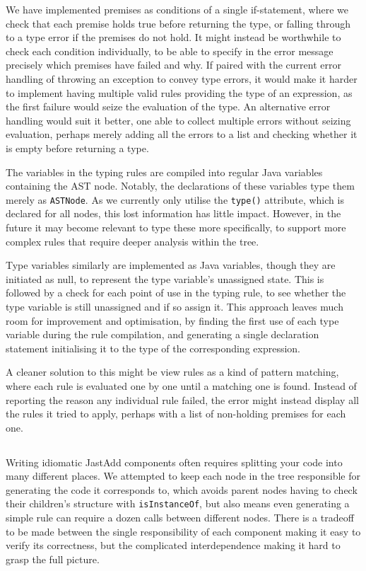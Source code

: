 \documentclass[nofilelist]{cslthse-msc}
\begin{document}
We have implemented premises as conditions of a single if-statement, where we check that each premise holds true before returning the type, or falling through to a type error if the premises do not hold.
It might instead be worthwhile to check each condition individually, to be able to specify in the error message precisely which premises have failed and why.
If paired with the current error handling of throwing an exception to convey type errors, it would make it harder to implement having multiple valid rules providing the type of an expression, as the first failure would seize the evaluation of the type.
An alternative error handling would suit it better, one able to collect multiple errors without seizing evaluation, perhaps merely adding all the errors to a list and checking whether it is empty before returning a type.

The variables in the typing rules are compiled into regular Java variables containing the AST node.
Notably, the declarations of these variables type them merely as \verb|ASTNode|.
As we currently only utilise the \lstinline{type()} attribute, which is declared for all nodes, this lost information has little impact.
However, in the future it may become relevant to type these more specifically, to support more complex rules that require deeper analysis within the tree.

Type variables similarly are implemented as Java variables, though they are initiated as null, to represent the type variable's unassigned state.
This is followed by a check for each point of use in the typing rule, to see whether the type variable is still unassigned and if so assign it.
This approach leaves much room for improvement and optimisation, by finding the first use of each type variable during the rule compilation, and generating a single declaration statement initialising it to the type of the corresponding expression.

A cleaner solution to this might be view rules as a kind of pattern matching, where each rule is evaluated one by one until a matching one is found.
Instead of reporting the reason any individual rule failed, the error might instead display all the rules it tried to apply, perhaps with a list of non-holding premises for each one.

\subsection{\rqthree}
Writing idiomatic JastAdd components often requires splitting your code into many different places.
We attempted to keep each node in the tree responsible for generating the code it corresponds to, which avoids parent nodes having to check their children's structure with \verb|isInstanceOf|, but also means even generating a simple rule can require a dozen calls between different nodes.
There is a tradeoff to be made between the single responsibility of each component making it easy to verify its correctness, but the complicated interdependence making it hard to grasp the full picture.
\end{document}
